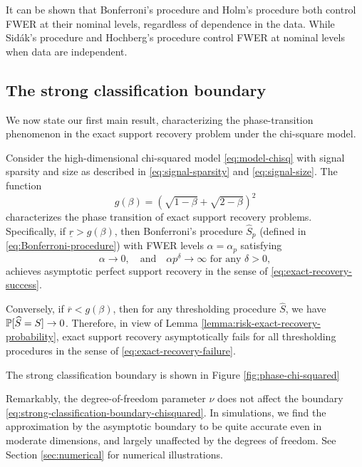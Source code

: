 It can be shown that Bonferroni's procedure and Holm's procedure both control FWER at their nominal levels, regardless of dependence in the data.
While Sid\'ak's procedure and Hochberg's procedure control FWER at nominal levels when data are independent.

\subsection{The strong classification boundary}
\label{subsec:strong-classification-boundary}

We now state our first main result, characterizing the phase-transition phenomenon in the exact support recovery problem under the chi-square model.

\begin{theorem} \label{thm:chi-squred-strong-boundary}
Consider the high-dimensional chi-squared model \eqref{eq:model-chisq} with signal sparsity and size as described in \eqref{eq:signal-sparsity} and \eqref{eq:signal-size}.
The function 
\begin{equation} \label{eq:strong-classification-boundary-chisquared}
    g(\beta) = \left(\sqrt{1-\beta} + \sqrt{2-\beta}\right)^2
\end{equation}
characterizes the phase transition of exact support recovery problems.
Specifically, if $\underline{r} > {{g}}(\beta)$, then Bonferroni's procedure $\widehat{S}_p$ (defined in \eqref{eq:Bonferroni-procedure}) with FWER levels $\alpha=\alpha_p$ satisfying
\begin{equation} \label{eq:FWER-rate-to-zero}
    \alpha\to 0,\quad \text{and} \quad \alpha p^\delta\to\infty \text{  for any } \delta>0,
\end{equation}
achieves asymptotic perfect support recovery in the sense of \eqref{eq:exact-recovery-success}. 

Conversely, if $\overline{r} < {{g}}(\beta)$, then for any thresholding procedure $\widehat{S}$, we have $\P[\widehat{S}=S]\to0$.
Therefore, in view of Lemma \ref{lemma:risk-exact-recovery-probability}, exact support recovery asymptotically fails for all thresholding procedures in the sense of \eqref{eq:exact-recovery-failure}.
\end{theorem}

The strong classification boundary is shown in Figure \ref{fig:phase-chi-squared}

\begin{remark}
Remarkably, the degree-of-freedom parameter $\nu$ does not affect the boundary \eqref{eq:strong-classification-boundary-chisquared}.
In simulations, we find the approximation by the asymptotic boundary to be quite accurate even in moderate dimensions, and largely unaffected by the degrees of freedom.
See Section \ref{sec:numerical} for numerical illustrations.
\end{remark}

